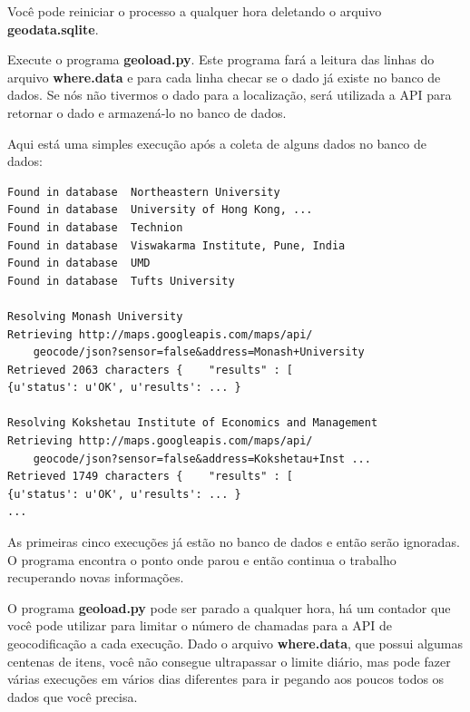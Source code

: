 Você pode reiniciar o processo a qualquer hora deletando o arquivo 
{\bf geodata.sqlite}.

Execute o programa {\bf geoload.py}. Este programa fará a leitura das linhas
do arquivo {\bf where.data} e para cada linha checar se o dado já existe no
banco de dados. Se nós não tivermos o dado para a localização, será utilizada
a API para retornar o dado e armazená-lo no banco de dados.  

Aqui está uma simples execução após a coleta de alguns dados no
banco de dados:

\beforeverb
\begin{verbatim}
Found in database  Northeastern University
Found in database  University of Hong Kong, ...
Found in database  Technion
Found in database  Viswakarma Institute, Pune, India
Found in database  UMD
Found in database  Tufts University

Resolving Monash University
Retrieving http://maps.googleapis.com/maps/api/
    geocode/json?sensor=false&address=Monash+University
Retrieved 2063 characters {    "results" : [  
{u'status': u'OK', u'results': ... }

Resolving Kokshetau Institute of Economics and Management
Retrieving http://maps.googleapis.com/maps/api/
    geocode/json?sensor=false&address=Kokshetau+Inst ...
Retrieved 1749 characters {    "results" : [  
{u'status': u'OK', u'results': ... }
...
\end{verbatim}
\afterverb
%

As primeiras cinco execuções já estão no banco de dados e então serão
ignoradas. O programa encontra o ponto onde parou e então continua
o trabalho recuperando novas informações.

O programa {\bf geoload.py} pode ser parado a qualquer hora, há um
contador que você pode utilizar para limitar o número de chamadas para a
API de geocodificação a cada execução. Dado o arquivo {\bf where.data}, que
possui algumas centenas de itens, você não consegue ultrapassar o limite diário,
mas pode fazer várias execuções em vários dias diferentes para ir pegando
aos poucos todos os dados que você precisa.

